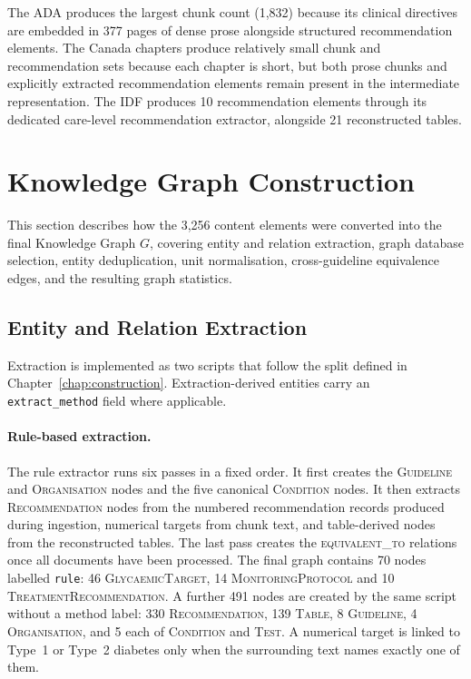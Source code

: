 The ADA produces the largest chunk count (1,832) because its clinical directives are embedded in 377 pages of dense prose alongside structured recommendation elements. The Canada chapters produce relatively small chunk and recommendation sets because each chapter is short, but both prose chunks and explicitly extracted recommendation elements remain present in the intermediate representation. 
The IDF produces 10 recommendation elements through its dedicated care-level recommendation extractor, alongside 21 reconstructed tables.



\section{Knowledge Graph Construction}
\label{sec:exp_norm}

This section describes how the 3,256 content elements were converted into the
final Knowledge Graph $G$, covering entity and relation extraction, graph
database selection, entity deduplication, unit normalisation, cross-guideline
equivalence edges, and the resulting graph statistics.
\subsection{Entity and Relation Extraction}
\label{sec:extraction-impl}

Extraction is implemented as two scripts that follow the split defined in
Chapter~\ref{chap:construction}. Extraction-derived entities carry an \texttt{extract\_method} field where applicable.

\paragraph{Rule-based extraction.}
The rule extractor runs six passes in a fixed order. It first creates the
\textsc{Guideline} and \textsc{Organisation} nodes and the five canonical
\textsc{Condition} nodes. It then extracts \textsc{Recommendation} nodes from the
numbered recommendation records produced during ingestion, numerical targets from
chunk text, and table-derived nodes from the reconstructed tables. The last pass
creates the \textsc{equivalent\_to} relations once all documents have been
processed. The final graph contains 70 nodes labelled \texttt{rule}: 46
\textsc{GlycaemicTarget}, 14 \textsc{MonitoringProtocol} and 10
\textsc{TreatmentRecommendation}. A further 491 nodes are created by the same
script without a method label: 330 \textsc{Recommendation}, 139 \textsc{Table},
8 \textsc{Guideline}, 4 \textsc{Organisation}, and 5 each of \textsc{Condition}
and \textsc{Test}. A numerical target is linked to Type~1 or Type~2 diabetes only
when the surrounding text names exactly one of them.

